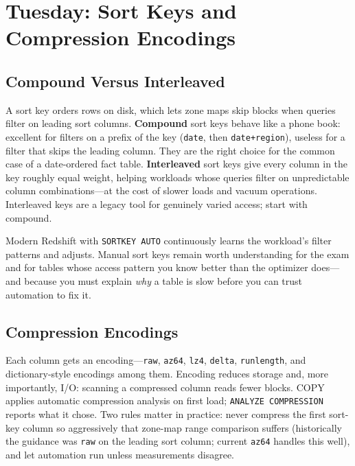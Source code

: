 \section{Tuesday: Sort Keys and Compression Encodings}
\subsection{Compound Versus Interleaved}
A sort key orders rows on disk, which lets zone maps skip blocks when queries filter on leading sort columns. \textbf{Compound} sort keys behave like a phone book: excellent for filters on a prefix of the key (\texttt{date}, then \texttt{date+region}), useless for a filter that skips the leading column. They are the right choice for the common case of a date-ordered fact table. \textbf{Interleaved} sort keys give every column in the key roughly equal weight, helping workloads whose queries filter on unpredictable column combinations---at the cost of slower loads and vacuum operations. Interleaved keys are a legacy tool for genuinely varied access; start with compound.

\begin{notebox}
Modern Redshift with \texttt{SORTKEY AUTO} continuously learns the workload's filter patterns and adjusts. Manual sort keys remain worth understanding for the exam and for tables whose access pattern you know better than the optimizer does---and because you must explain \emph{why} a table is slow before you can trust automation to fix it.
\end{notebox}

\subsection{Compression Encodings}
Each column gets an encoding---\texttt{raw}, \texttt{az64}, \texttt{lz4}, \texttt{delta}, \texttt{runlength}, and dictionary-style encodings among them. Encoding reduces storage and, more importantly, I/O: scanning a compressed column reads fewer blocks. COPY applies automatic compression analysis on first load; \texttt{ANALYZE COMPRESSION} reports what it chose. Two rules matter in practice: never compress the first sort-key column so aggressively that zone-map range comparison suffers (historically the guidance was \texttt{raw} on the leading sort column; current \texttt{az64} handles this well), and let automation run unless measurements disagree.

